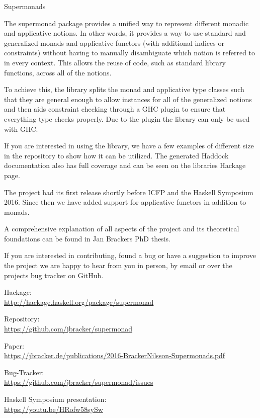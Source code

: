 \begin{hcarentry}[updated]{Supermonads}
\label{supermonads}
\makeheader

The supermonad package provides a unified way to represent different monadic
and applicative notions. In other words, it provides a way to use standard and
generalized monads and applicative functors (with additional indices or
constraints) without having to manually disambiguate which notion is referred
to in every context. This allows the reuse of code, such as standard library
functions, across all of the notions.

To achieve this, the library splits the monad and applicative type classes
such that they are general enough to allow instances for all of the
generalized notions and then aids constraint checking through a GHC plugin to
ensure that everything type checks properly. Due to the plugin the library can
only be used with GHC.

If you are interested in using the library, we have a few examples of
different size in the repository to show how it can be utilized. The generated
Haddock documentation also has full coverage and can be seen on the libraries
Hackage page.

The project had its first release shortly before ICFP and the Haskell
Symposium 2016. Since then we have added support for applicative functors in
addition to monads.

A comprehensive explanation of all aspects of the project
and its theoretical foundations can be found in Jan Brackers PhD thesis.

If you are interested in contributing, found a bug or have a suggestion to
improve the project we are happy to hear from you in person, by email or over
the projects bug tracker on GitHub.

\FurtherReading
\begin{compactitem}
  \item Hackage:\\ \url{http://hackage.haskell.org/package/supermonad}
  \item Repository:\\ \url{https://github.com/jbracker/supermonad}
  \item Paper:\\
    \url{https://jbracker.de/publications/2016-BrackerNilsson-Supermonads.pdf}
  \item Bug-Tracker:\\ \url{https://github.com/jbracker/supermonad/issues}
  \item Haskell Symposium presentation:\\ \url{https://youtu.be/HRofw58sySw}
\end{compactitem}
\end{hcarentry}
